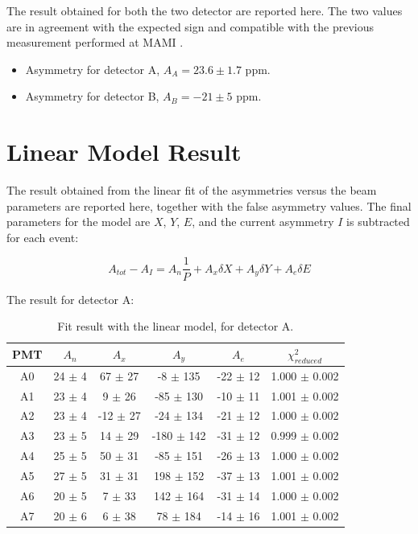 The result obtained for both the two detector are reported here. The two values are in agreement with the expected sign and compatible with the previous measurement performed at MAMI \cite{Esser:2018vdp}. 

\begin{itemize}
\item Asymmetry for detector A, $A_{A} =  23.6 \pm 1.7$ ppm.
\item Asymmetry for detector B, $A_{B} = -21 \pm 5$ ppm.
\end{itemize}

\newpage
\section{Linear Model Result}
The result obtained from the linear fit of the asymmetries versus the beam parameters are reported here, together with the false asymmetry values. The final parameters for the model are $X$, $Y$, $E$, and the current asymmetry $I$ is subtracted for each event:

\begin{equation}
A_{tot} - A_{I} = A_{n} \frac{1}{P} + A_{x} \delta X + A_{y} \delta Y + A_{e} \delta E
\end{equation}

The result for detector A: 

\begin{table}[hbtp] 
\centering
\begin{tabular}{c|c|c|c|c|c}
\hline
 PMT   & $A_{n}$    & $A_{x}$          & $A_{y}$            & $A_{e}$         & $\chi^{2}_{reduced}$ \\
\hline
 A0    & 24 $\pm$ 4 & 67 $\pm$ 27  & -8 $\pm$ 135   & -22 $\pm$ 12 & 1.000 $\pm$ 0.002   \\
 A1    & 23 $\pm$ 4 & 9 $\pm$ 26   & -85 $\pm$ 130  & -10 $\pm$ 11 & 1.001 $\pm$ 0.002 \\
 A2    & 23 $\pm$ 4 & -12 $\pm$ 27 & -24 $\pm$ 134  & -21 $\pm$ 12 & 1.000 $\pm$ 0.002   \\
 A3    & 23 $\pm$ 5 & 14 $\pm$ 29  & -180 $\pm$ 142 & -31 $\pm$ 12 & 0.999 $\pm$ 0.002 \\
 A4    & 25 $\pm$ 5 & 50 $\pm$ 31  & -85 $\pm$ 151  & -26 $\pm$ 13 & 1.000 $\pm$ 0.002   \\
 A5    & 27 $\pm$ 5 & 31 $\pm$ 31  & 198 $\pm$ 152  & -37 $\pm$ 13 & 1.001 $\pm$ 0.002 \\
 A6    & 20 $\pm$ 5 & 7 $\pm$ 33   & 142 $\pm$ 164  & -31 $\pm$ 14 & 1.000 $\pm$ 0.002   \\
 A7    & 20 $\pm$ 6 & 6 $\pm$ 38   & 78 $\pm$ 184   & -14 $\pm$ 16 & 1.001 $\pm$ 0.002 \\
\hline
\end{tabular}
\caption{Fit result with the linear model, for detector A.}
\label{tab:resultA}
\end{table}

